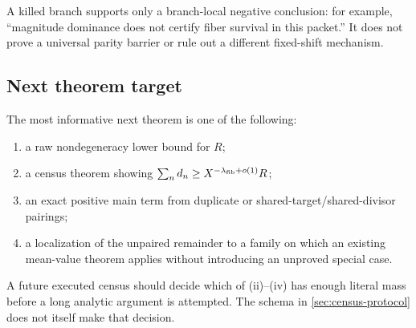 A killed branch supports only a branch-local negative conclusion:
for example, ``magnitude dominance does not certify fiber survival in
this packet.''  It does not prove a universal parity barrier or rule
out a different fixed-shift mechanism.

\subsection{Next theorem target}

The most informative next theorem is one of the following:
\begin{enumerate}[leftmargin=2.2em,label=(\roman*)]
 \item a raw nondegeneracy lower bound for \(R\);
 \item a census theorem showing
 \(\sum_nd_n\ge X^{-\lambda_{\rm fib}+o(1)}R\);
 \item an exact positive main term from duplicate or
 shared-target/shared-divisor pairings;
 \item a localization of the unpaired remainder to a family on which
 an existing mean-value theorem applies without introducing an
 unproved special case.
\end{enumerate}
A future executed census should decide which of (ii)--(iv) has enough
literal mass before a long analytic argument is attempted.  The
schema in \cref{sec:census-protocol} does not itself make that
decision.
